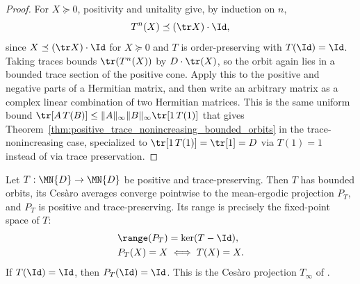 \begin{proof}\leanok
    For $X\succeq0$, positivity and unitality give, by induction on $n$,
    \[
        T^n(X)\preceq(\tr X)\cdot\Id,
    \]
    since $X\preceq(\tr X)\cdot\Id$ for $X\succeq0$ and $T$ is order-preserving
    with $T(\Id)=\Id$. Taking traces bounds $\tr(T^n(X))$ by $D\cdot\tr(X)$,
    so the orbit again lies in a bounded trace section of the positive cone.
    Apply this to the positive and negative parts of a Hermitian matrix, and
    then write an arbitrary matrix as a complex linear combination of two
    Hermitian matrices. This is the same uniform bound
    $\tr[A\,T(B)]\leq\|A\|_\infty\|B\|_\infty\tr[1\,T(1)]$ that gives
    Theorem~\ref{thm:positive_trace_nonincreasing_bounded_orbits} in the
    trace-nonincreasing case, specialized to $\tr[1\,T(1)]=\tr[1]=D$ via
    $T(1)=1$ instead of via trace preservation.
\end{proof}

\begin{theorem}
    \label{thm:positive_trace_preserving_mean_ergodic_projection}
    \leanok
    Let $T:\MN{D}\to\MN{D}$ be positive and trace-preserving. Then $T$ has
    bounded orbits, its Ces\`aro averages converge pointwise to the
    mean-ergodic projection $P_T$, and $P_T$ is positive and trace-preserving.
    Its range is precisely the fixed-point space of $T$:
    \begin{align}
        \range(P_T) & =\ker(T-\Id), \notag \\
        P_T(X)=X    & \iff T(X)=X.
        \label{eq:channel_positive_mean_ergodic}
    \end{align}
    If $T(\Id)=\Id$, then $P_T(\Id)=\Id$.
    This is the Ces\`aro projection $T_\infty$ of
    \cite[Proposition~6.3 and Equation~(6.14)]{Wolf2012Quantum}.
\end{theorem}


